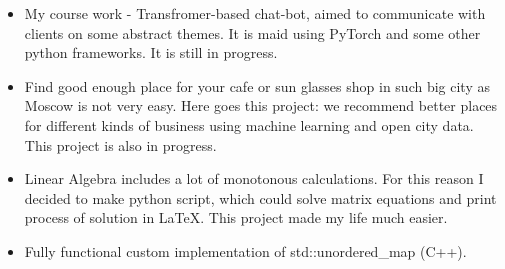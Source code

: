







\begin{itemize}
\item My course work - Transfromer-based chat-bot, aimed to communicate with clients on some abstract themes. It is maid using PyTorch and some other python frameworks. It is still in progress.
\end{itemize}
\smallskip
\smallskip
{}
\begin{itemize}
\item Find good enough place for your cafe or sun glasses shop in such big city as Moscow is not very easy. Here goes this project: we recommend better places for different kinds of business using machine learning and open city data. This project is also in progress.
\end{itemize}
\smallskip
\smallskip
{}
\begin{itemize}
\item Linear Algebra includes a lot of monotonous calculations. For this reason I decided to make python script, which could solve matrix equations and print process of solution in LaTeX. This project made my life much easier.
\end{itemize}
\smallskip
\smallskip
{}
\begin{itemize}
\item Fully functional custom implementation of std::unordered\_map (C++).
\end{itemize}
